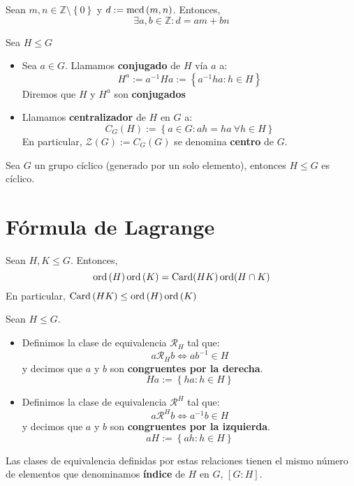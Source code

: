 \begin{prop}
Sean $m, n \in \mathbb{Z}\setminus \left\{ 0 \right\}$ y $d := \operatorname{mcd} \left( m, n \right)$. Entonces,
\[
\exists a, b \in \mathbb{Z} : d = am + bn
\]
\end{prop}

\begin{defi}
Sea $H \le G$
\begin{itemize}
\item Sea $a \in G$. Llamamos \textbf{conjugado} de $H$ vía $a$ a:
\[
H^a := a^{-1}Ha := \left\{ a^{-1}ha : h \in H \right\}
\]
Diremos que $H$ y $H^a$ son \textbf{conjugados}

\item Llamamos \textbf{centralizador} de $H$ en $G$ a:
\[
C_G\left( H \right) := \left\{ a \in G: ah = ha\ \forall h \in H \right\}
\]
En particular, $\mathcal{Z}\left( G \right) := C_G\left( G \right)$ se denomina \textbf{centro} de $G$.
\end{itemize}

\begin{prop}
Sea $G$ un grupo cíclico (generado por un solo elemento), entonces $H \le G$ es cíclico.
\end{prop}
\end{defi}

\section{Fórmula de Lagrange}
\begin{prop}
Sean $H, K \le G$. Entonces,
\[
\operatorname{ord}\left( H \right)\operatorname{ord}\left( K \right) = \operatorname{Card}(HK)\operatorname{ord}(H \cap K)
\]
En particular, $\operatorname{Card}\left( HK \right) \le \operatorname{ord}\left( H \right) \operatorname{ord}\left( K \right)$
\end{prop}

\begin{defi}
Sean $H \le G$.
\begin{itemize}
    \item Definimos la clase de equivalencia $\mathcal{R}_H$ tal que:
    \[
    a \mathcal{R}_H b \Leftrightarrow a b^{-1} \in H
    \]
    y decimos que $a$ y $b$ son \textbf{congruentes por la derecha}.
    \[
    Ha := \left\{ ha : h \in H \right\}
    \]
    \item Definimos la clase de equivalencia $\mathcal{R}^H$ tal que:
    \[
    a \mathcal{R}^H b \Leftrightarrow a^{-1}b \in H
    \]
    y decimos que $a$ y $b$ son \textbf{congruentes por la izquierda}.
    \[
    a H := \left\{ ah : h \in H \right\}
    \]
\end{itemize}
Las clases de equivalencia definidas por estas relaciones tienen el mismo número de elementos que denominamos \textbf{índice} de $H$ en $G$, $\left[ G : H \right]$.
\end{defi}

